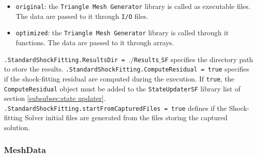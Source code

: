 \documentclass[11pt,a4paper,oneside]{article}
\begin{document}
\begin{itemize}
\item{\texttt{original}: the \texttt{Triangle Mesh Generator} library is called as executable files. The data are passed to it through \texttt{I/O} files.}
\item{\texttt{optimized}: the \texttt{Triangle Mesh Generator} library is called through it functions. The data are passed to it through arrays.}
\end{itemize}
\vspace*{0.6cm}
\hspace*{1cm} \texttt{.StandardShockFitting.ResultsDir = $./$Results$\_$SF}
\newline
\newline
specifies the directory path to store the results.
\newline
\newline
\hspace*{1cm} \texttt{.StandardShockFitting.ComputeResidual = true}
\newline
\newline
specifies if the shock-fitting residual are computed during the execution. If \texttt{true}, the \texttt{ComputeResidual} object must be added to the \texttt{StateUpdaterSF} library list of section \ref{subsubsec:state updater}.
\newline
\newline
\hspace*{1cm} \texttt{.StandardShockFitting.startFromCapturedFiles = true}
\newline
\newline
defines if the Shock-fitting Solver initial files are generated from the files storing the captured solution.

\subsubsection*{MeshData}
\end{document}
